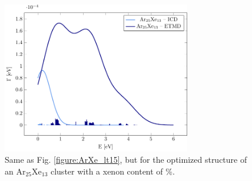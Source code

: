 \begin{figure}
 \centering
 \includegraphics[width=8.2cm]{pics/Ar25Xe13.pdf}
 \caption{
          Same as Fig. \ref{figure:ArXe_lt15}, but for the 
          optimized structure of an Ar$_25$Xe$_{13}$ cluster 
          with a xenon content of \unit[34]{\%}.}
 \label{}
\end{figure}

